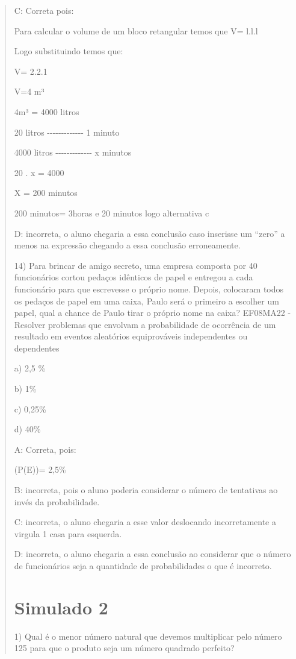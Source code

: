 \begin{quote}
\begin{escolha}
C: Correta pois:

Para calcular o volume de um bloco retangular temos que V= l.l.l

Logo substituindo temos que:

V= 2.2.1

V=4 m³

4m³ = 4000 litros

20 litros -\/-\/-\/-\/-\/-\/-\/-\/-\/-\/-\/-\/- 1 minuto

4000 litros -\/-\/-\/-\/-\/-\/-\/-\/-\/-\/-\/-\/- x minutos

20 . x = 4000

X = 200 minutos

200 minutos= 3horas e 20 minutos logo alternativa c

D: incorreta, o aluno chegaria a essa conclusão caso inserisse um
``zero'' a menos na expressão chegando a essa conclusão erroneamente.

14) Para brincar de amigo secreto, uma empresa composta por 40
funcionários cortou pedaços idênticos de papel e entregou a cada
funcionário para que escrevesse o próprio nome. Depois, colocaram todos
os pedaços de papel em uma caixa, Paulo será o primeiro a escolher um
papel, qual a chance de Paulo tirar o próprio nome na caixa? EF08MA22 -
Resolver problemas que envolvam a probabilidade de ocorrência de um
resultado em eventos aleatórios equiprováveis independentes ou
dependentes

a) 2,5 \%

b) 1\%

c) 0,25\%

d) 40\%

A: Correta, pois:

(P(E))= 2,5\%

B: incorreta, pois o aluno poderia considerar o número de tentativas ao
invés da probabilidade.

C: incorreta, o aluno chegaria a esse valor deslocando incorretamente a
virgula 1 casa para esquerda.

D: incorreta, o aluno chegaria a essa conclusão ao considerar que o
número de funcionários seja a quantidade de probabilidades o que é
incorreto.

\section{Simulado 2}

1) Qual é o menor número natural que devemos multiplicar pelo número 125
para que o produto seja um número quadrado perfeito?


\end{escolha}
\end{quote}

